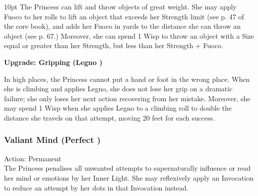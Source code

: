 \begin{myindentpar}{10pt}
The Princess can lift and throw objects of great weight. She may apply Fuoco to her rolls to lift an object that exceeds her Strength limit (see p. 47 of the core book), and adds her Fuoco in yards to the distance she can throw an object (see p. 67.) Moreover, she can spend 1 Wisp to throw an object with a Size equal or greater than her Strength, but less than her Strength + Fuoco.

\textbf{Upgrade: Gripping (Legno \textbullet\textbullet)}

In high places, the Princess cannot put a hand or foot in the wrong place. When she is climbing and applies Legno, she does not lose her grip on a dramatic failure; she only loses her next action recovering from her mistake. Moreover, she may spend 1 Wisp when she applies Legno to a climbing roll to double the distance she travels on that attempt, moving 20 feet for each success.\end{myindentpar}

\subsubsection*{Valiant Mind (Perfect \textbullet)}

\noindent Action: Permanent \\

\noindent The Princess penalises all unwanted attempts to supernaturally influence or read her mind or emotions by her Inner Light. She may reflexively apply an Invocation to reduce an attempt by her dots in that Invocation instead. 

